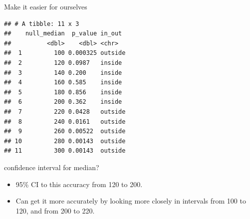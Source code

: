 \documentclass[
  ignorenonframetext,
]{beamer}
\newenvironment{Shaded}{\begin{snugshade}}{\end{snugshade}}
\newcommand{\DataTypeTok}[1]{\textcolor[rgb]{0.13,0.29,0.53}{#1}}
\newcommand{\FloatTok}[1]{\textcolor[rgb]{0.00,0.00,0.81}{#1}}
\newcommand{\KeywordTok}[1]{\textcolor[rgb]{0.13,0.29,0.53}{\textbf{#1}}}
\newcommand{\NormalTok}[1]{#1}
\newcommand{\OperatorTok}[1]{\textcolor[rgb]{0.81,0.36,0.00}{\textbf{#1}}}
\newcommand{\StringTok}[1]{\textcolor[rgb]{0.31,0.60,0.02}{#1}}
\providecommand{\tightlist}{%
  \setlength{\itemsep}{0pt}\setlength{\parskip}{0pt}}
\begin{document}
\begin{frame}[fragile]{Make it easier for ourselves}
\protect\hypertarget{make-it-easier-for-ourselves}{}

\begin{Shaded}
\end{Shaded}

\begin{verbatim}
## # A tibble: 11 x 3
##    null_median  p_value in_out 
##          <dbl>    <dbl> <chr>  
##  1         100 0.000325 outside
##  2         120 0.0987   inside 
##  3         140 0.200    inside 
##  4         160 0.585    inside 
##  5         180 0.856    inside 
##  6         200 0.362    inside 
##  7         220 0.0428   outside
##  8         240 0.0161   outside
##  9         260 0.00522  outside
## 10         280 0.00143  outside
## 11         300 0.00143  outside
\end{verbatim}

\end{frame}

\begin{frame}{confidence interval for median?}
\protect\hypertarget{confidence-interval-for-median}{}

\begin{itemize}
\tightlist
\item
  95\% CI to this accuracy from 120 to 200.
\item
  Can get it more accurately by looking more closely in intervals from
  100 to 120, and from 200 to 220.
\end{itemize}

\end{frame}
\end{document}
